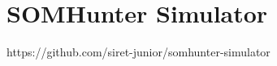 \chapter{SOMHunter Simulator}
\label{somhunter-simulator}


https://github.com/siret-junior/somhunter-simulator
